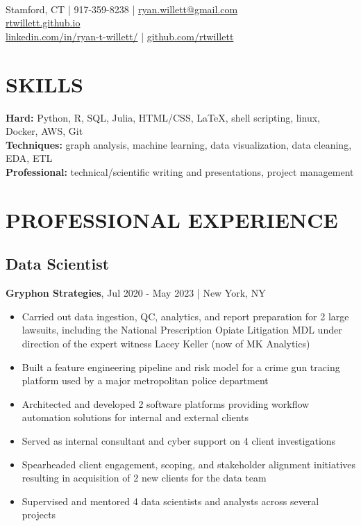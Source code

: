 \documentclass[11pt]{article}
\title{\vspace{-7cm}}
\date{}
\author{Ryan Willett}
\newenvironment{myitemize}
{ \begin{itemize}
	\setlength{\itemsep}{0pt}
	\setlength{\parskip}{0pt}
	\setlength{\parsep}{0pt}     }
{ \end{itemize}                  }
\begin{document}
\maketitle

\section*{}
  \\
\normalsize
Stamford, CT | 917-359-8238 | \href{mailto:ryan.willett@gmail.com}{ryan.willett@gmail.com} \\
\href{http://rtwillett.github.io}{rtwillett.github.io} \\
\href{https://linkedin.com/in/ryan-t-willett/}{linkedin.com/in/ryan-t-willett/} | \href{https://github.com/rtwillett}{github.com/rtwillett}

\raggedright

\section*{SKILLS}
{\bfseries Hard:} Python, R, SQL, Julia, HTML/CSS, \LaTeX, shell scripting, linux, Docker, AWS, Git \\
{\bfseries Techniques:} graph analysis, machine learning, data visualization, data cleaning, EDA, ETL \\
{\bfseries Professional:} technical/scientific writing and presentations, project management

\section*{PROFESSIONAL EXPERIENCE}
\subsection*{Data Scientist}
{\bfseries Gryphon Strategies}, Jul 2020 - May 2023 | New York, NY
\begin{myitemize}
	\item Carried out data ingestion, QC, analytics, and report preparation for 2 large lawsuits, including the National Prescription Opiate Litigation MDL under direction of the expert witness Lacey Keller (now of MK Analytics)
	\item Built a feature engineering pipeline and risk model for a crime gun tracing platform used by a major metropolitan police department
	\item Architected and developed 2 software platforms providing workflow automation solutions for internal and external clients
	\item Served as internal consultant and cyber support on 4 client investigations
	\item Spearheaded client engagement, scoping, and stakeholder alignment initiatives resulting in acquisition of 2 new clients for the data team
	\item Supervised and mentored 4 data scientists and analysts across several projects
\end{myitemize}
\end{document}

